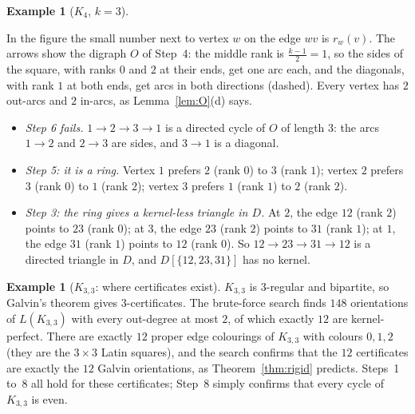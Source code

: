 \documentclass[11pt]{article}
\theoremstyle{plain}
\theoremstyle{definition}
\newtheorem{example}[theorem]{Example}
\theoremstyle{remark}
\newcommand{\half}{\tfrac{k-1}{2}}
\begin{document}
\begin{example}[$K_4$, $k=3$]
\begin{center}
\end{center}
In the figure the small number next to vertex $w$ on the edge $wv$ is $r_w(v)$. The arrows show
the digraph $O$ of Step~4: the middle rank is $\half=1$, so the sides of the square, with ranks
$0$ and $2$ at their ends, get one arc each, and the diagonals, with rank $1$ at both ends, get
arcs in both directions (dashed). Every vertex has $2$ out-arcs and $2$ in-arcs, as
Lemma~\ref{lem:O}(d) says.
\begin{itemize}
  \item \emph{Step 6 fails.} $1\to 2\to 3\to 1$ is a directed cycle of $O$ of length $3$: the
    arcs $1\to 2$ and $2\to 3$ are sides, and $3\to 1$ is a diagonal.
  \item \emph{Step 5: it is a ring.} Vertex $1$ prefers $2$ (rank $0$) to $3$ (rank $1$); vertex
    $2$ prefers $3$ (rank $0$) to $1$ (rank $2$); vertex $3$ prefers $1$ (rank $1$) to $2$ (rank
    $2$).
  \item \emph{Step 3: the ring gives a kernel-less triangle in $D$.} At $2$, the edge $12$ (rank
    $2$) points to $23$ (rank $0$); at $3$, the edge $23$ (rank $2$) points to $31$ (rank $1$);
    at $1$, the edge $31$ (rank $1$) points to $12$ (rank $0$). So $12\to 23\to 31\to 12$ is a
    directed triangle in $D$, and $D[\{12,23,31\}]$ has no kernel.
\end{itemize}
\end{example}

\begin{example}[$K_{3,3}$: where certificates exist]\label{ex:k33}
$K_{3,3}$ is $3$-regular and bipartite, so Galvin's theorem gives $3$-certificates. The
brute-force search finds $148$ orientations of $L(K_{3,3})$ with every out-degree at most $2$,
of which exactly $12$ are kernel-perfect. There are exactly $12$ proper edge colourings of
$K_{3,3}$ with colours $0,1,2$ (they are the $3\times 3$ Latin squares), and the search confirms
that the $12$ certificates are exactly the $12$ Galvin orientations, as
Theorem~\ref{thm:rigid} predicts. Steps~1 to~8 all hold for these certificates; Step~8 simply
confirms that every cycle of $K_{3,3}$ is even.
\end{example}
\end{document}
